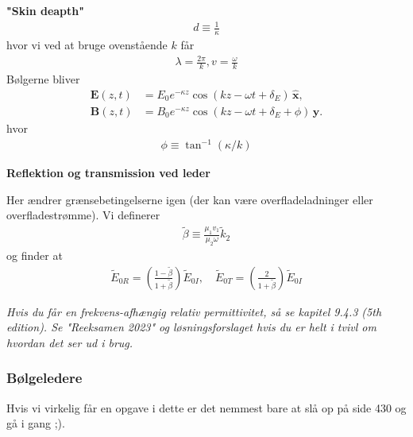 \documentclass[a4paper]{article}
\begin{document}
    \textbf{"Skin deapth"} 
    \begin{align*}
        d \equiv \frac{1}{\kappa } \tag{9.130}
    \end{align*}
    hvor vi ved at bruge ovenstående \(k\) får \begin{align*}
        \lambda = \frac{2\pi}{k}, v = \frac{\omega}{k} \tag{9.131}
    \end{align*} 
    Bølgerne bliver \[
        \begin{aligned}
        \mathbf{E}(z, t) &= E_0 e^{-\kappa z} \cos(kz - \omega t + \delta_E) \, \hat{\mathbf{x}}, \\[5pt]
        \mathbf{B}(z, t) &= B_0 e^{-\kappa z} \cos(kz - \omega t + \delta_E + \phi) \, \hat{\mathbf{y}}.
        \end{aligned}
        \]
    hvor \begin{align*}
        \phi \equiv \tan ^{-1} \left( \kappa / k \right)  \tag{9.136}
    \end{align*}

    \textbf{Reflektion og transmission ved leder}
    
    Her ændrer grænsebetingelserne igen (der kan være overfladeladninger eller overfladestrømme). Vi definerer \begin{align*}
        \tilde{\beta } \equiv \frac{\mu _1 v_1}{\mu _2 \omega } \tilde{k}_2 \tag{9.148}
    \end{align*}
    og finder at \begin{align*}
        \tilde{E}_{0R} = \left( \frac{1 - \tilde{\beta}}{1 + \tilde{\beta}} \right) \tilde{E}_{0I}, \quad
        \tilde{E}_{0T} = \left( \frac{2}{1 + \tilde{\beta}} \right) \tilde{E}_{0I} \tag{9.149}
    \end{align*}

    \textit{Hvis du får en frekvens-afhængig relativ permittivitet, så se kapitel 9.4.3 (5th edition). Se "Reeksamen 2023" og løsningsforslaget hvis du er helt i tvivl om hvordan det ser ud i brug.}

    \subsubsection{Bølgeledere}
    Hvis vi virkelig får en opgave i dette er det nemmest bare at slå op på side 430 og gå i gang ;).
\end{document}
